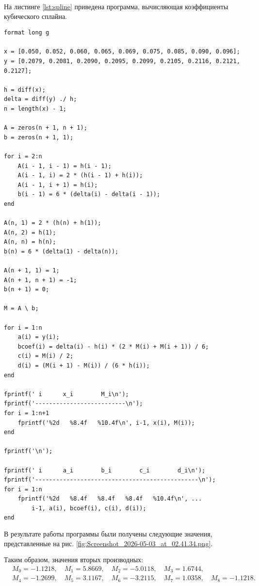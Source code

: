 На листинге \ref{lst:spline} приведена программа, вычисляющая коэффициенты кубического сплайна.

\begin{listing}[H]
\caption{Вычисление коэффициентов периодического кубического сплайна}
\vspace{-20pt}
\label{lst:spline}
\begin{verbatim}
format long g

x = [0.050, 0.052, 0.060, 0.065, 0.069, 0.075, 0.085, 0.090, 0.096];
y = [0.2079, 0.2081, 0.2090, 0.2095, 0.2099, 0.2105, 0.2116, 0.2121, 0.2127];

h = diff(x);
delta = diff(y) ./ h;
n = length(x) - 1;

A = zeros(n + 1, n + 1);
b = zeros(n + 1, 1);

for i = 2:n
    A(i - 1, i - 1) = h(i - 1);
    A(i - 1, i) = 2 * (h(i - 1) + h(i));
    A(i - 1, i + 1) = h(i);
    b(i - 1) = 6 * (delta(i) - delta(i - 1));
end

A(n, 1) = 2 * (h(n) + h(1));
A(n, 2) = h(1);
A(n, n) = h(n);
b(n) = 6 * (delta(1) - delta(n));

A(n + 1, 1) = 1;
A(n + 1, n + 1) = -1;
b(n + 1) = 0;

M = A \ b;

for i = 1:n
    a(i) = y(i);
    bcoef(i) = delta(i) - h(i) * (2 * M(i) + M(i + 1)) / 6;
    c(i) = M(i) / 2;
    d(i) = (M(i + 1) - M(i)) / (6 * h(i));
end

fprintf(' i      x_i        M_i\n');
fprintf('--------------------------\n');
for i = 1:n+1
    fprintf('%2d   %8.4f   %10.4f\n', i-1, x(i), M(i));
end

fprintf('\n');

fprintf(' i      a_i        b_i        c_i        d_i\n');
fprintf('-----------------------------------------------\n');
for i = 1:n
    fprintf('%2d   %8.4f   %8.4f   %8.4f   %10.4f\n', ...
        i-1, a(i), bcoef(i), c(i), d(i));
end
\end{verbatim}
\end{listing}

В результате работы программы были получены следующие значения, представленные на рис. \ref{fig:Screenshot_2026-05-03_at_02.41.34.png}.


Таким образом, значения вторых производных:
\[
\begin{aligned}
&M_0=-1.1218, \quad M_1=5.8669, \quad M_2=-5.0118, \quad M_3=1.6744,\\
&M_4=-1.2699, \quad M_5=3.1167, \quad M_6=-3.2115, \quad M_7=1.0358, \quad M_8=-1.1218.
\end{aligned}
\]


